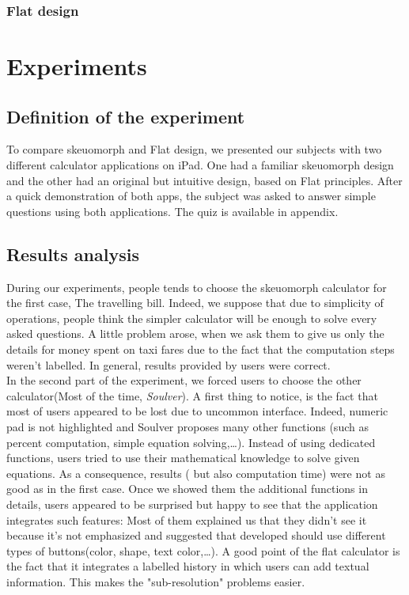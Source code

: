 \documentclass[a4paper,11pt] {article}
\theoremstyle{definition}
\begin{document}
        \subsubsection{Flat design}


\section{Experiments}
\label{sct:experiment}

    \subsection{Definition of the experiment}

    To compare skeuomorph and Flat design, we presented our subjects with two different calculator applications on iPad. One had a familiar skeuomorph design and the other had an original but intuitive design, based on Flat principles. After a quick demonstration of both apps, the subject was asked to answer simple questions using both applications. The quiz is available in appendix.\\


    \subsection{Results analysis}
    
    During our experiments, people tends to choose the skeuomorph calculator for the first case, The travelling bill. Indeed, we suppose that due to simplicity of operations, people think the simpler calculator will be enough to solve every asked questions. A little problem arose, when we ask them to give us only the details for money spent on taxi fares due to the fact that the computation steps weren't labelled. In general, results provided by users were correct.\\
    
    In the second part of the experiment, we forced users to choose the other calculator(Most of the time, \textit{Soulver}). A first thing to notice, is the fact that most of users appeared to be lost due to uncommon interface. Indeed, numeric pad is not highlighted and Soulver proposes many other functions (such as percent computation, simple equation solving,\ldots). Instead of using dedicated functions, users tried to use their mathematical knowledge to solve given equations. As a consequence, results ( but also computation time) were not as good as in the first case. Once we showed them the additional functions in details, users appeared to be surprised but happy to see that the application integrates such features: Most of them explained us that they didn't see it because it's not emphasized and suggested that developed should use different types of buttons(color, shape, text color,\ldots). A good point of the flat calculator is the fact that it integrates a labelled history in which users can add textual information. This makes the "sub-resolution" problems easier.\\
    
\end{document}
